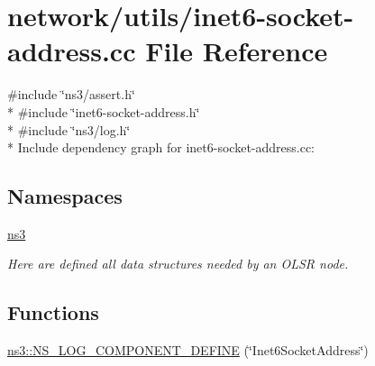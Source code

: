 \hypertarget{inet6-socket-address_8cc}{}\section{network/utils/inet6-\/socket-\/address.cc File Reference}
\label{inet6-socket-address_8cc}
{\ttfamily \#include \char`\"{}ns3/assert.\+h\char`\"{}}\\*
{\ttfamily \#include \char`\"{}inet6-\/socket-\/address.\+h\char`\"{}}\\*
{\ttfamily \#include \char`\"{}ns3/log.\+h\char`\"{}}\\*
Include dependency graph for inet6-\/socket-\/address.cc\+:
\subsection*{Namespaces}
\begin{DoxyCompactItemize}
\item 
 \hyperlink{namespacens3}{ns3}
\begin{DoxyCompactList}\small\item\em Here are defined all data structures needed by an O\+L\+SR node. \end{DoxyCompactList}\end{DoxyCompactItemize}
\subsection*{Functions}
\begin{DoxyCompactItemize}
\item 
\hyperlink{namespacens3_adbf1c077591cc4c536dd5c85396bd2a4}{ns3\+::\+N\+S\+\_\+\+L\+O\+G\+\_\+\+C\+O\+M\+P\+O\+N\+E\+N\+T\+\_\+\+D\+E\+F\+I\+NE} (\char`\"{}Inet6\+Socket\+Address\char`\"{})
\end{DoxyCompactItemize}
